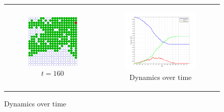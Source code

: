 \begin{figure}
\begin{center}
\begin{tabular}{c c}
    	\\
    	
		\begin{subfigure}[b]{0.3\textwidth}
			\centering
			\includegraphics[width=1\textwidth, angle=0]{./fig/step5_environment/SIR_environment_30x30agents_t160_01dt.png}
			\caption{$t = 160$}
			\label{fig:sir_env_t160}
		\end{subfigure}
		& 
		\begin{subfigure}[b]{0.38\textwidth}
			\centering
			\includegraphics[width=1\textwidth, angle=0]{./fig/step5_environment/SIR_dynamics_30x30agents_300t_01dt.png}
			\caption{Dynamics over time}
			\label{fig:sir_dynamics_30x30agents_300t_01dt}
		\end{subfigure}
	\end{tabular}
	

\end{center}
\end{figure}
